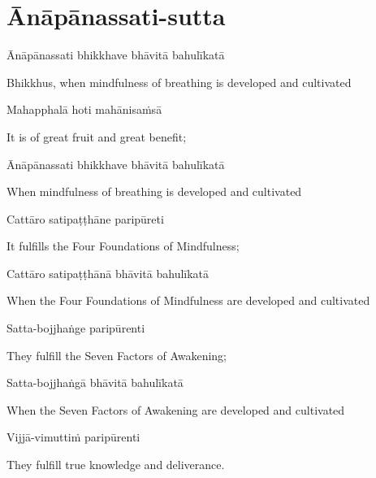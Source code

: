 \section{Ānāpānassati-sutta}


\begin{leader}
\end{leader}

Ānāpānassati bhikkhave bhāvitā bahulīkatā

\begin{english}
  Bhikkhus, when mindfulness of breathing is developed and cultivated
\end{english}

Mahapphalā hoti mahānisaṁsā

\begin{english}
  It is of great fruit and great benefit;
\end{english}

Ānāpānassati bhikkhave bhāvitā bahulīkatā

\begin{english}
  When mindfulness of breathing is developed and cultivated
\end{english}

Cattāro satipaṭṭhāne paripūreti

\begin{english}
  It fulfills the Four Foundations of Mindfulness;
\end{english}

Cattāro satipaṭṭhānā bhāvitā bahulīkatā

\begin{english}
  When the Four Foundations of Mindfulness are developed and cultivated
\end{english}

Satta-bojjhaṅge paripūrenti

\begin{english}
  They fulfill the Seven Factors of Awakening;
\end{english}

Satta-bojjhaṅgā bhāvitā bahulīkatā

\begin{english}
  When the Seven Factors of Awakening are developed and cultivated
\end{english}

Vijjā-vimuttiṁ paripūrenti

\begin{english}
  They fulfill true knowledge and deliverance.
\end{english}

